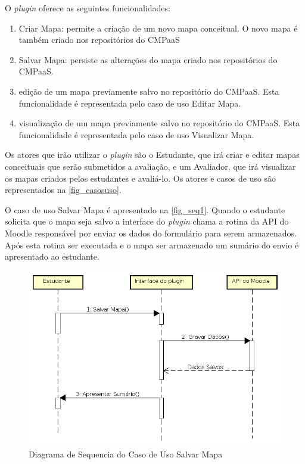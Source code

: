 \documentclass[
	12pt,				%
	openright,			%
	oneside,			%
	a4paper,			%
	english,			%
	french,				%
	spanish,			%
	brazil				%
	]{abntex2}
\begin{document}
O \textit{plugin} oferece as seguintes funcionalidades:

\begin{enumerate}
	\item Criar Mapa: permite a criação de um novo mapa conceitual. O novo mapa é também criado nos repositórios do CMPaaS
	\item Salvar Mapa: persiste as alterações do  mapa  criado  nos  repositórios  do  CMPaaS.
	\item  edição de um mapa previamente salvo no repositório do CMPaaS. Esta funcionalidade é representada pelo caso de uso Editar Mapa.
	\item visualização de um mapa previamente salvo no repositório do CMPaaS. Esta funcionalidade é representada pelo caso de uso Visualizar Mapa.
\end{enumerate}  

Os atores que irão utilizar o \textit{plugin} são o Estudante, que irá criar e editar mapas conceituais que serão submetidos a avaliação, e um Avaliador, que irá visualizar os mapas criados pelos estudantes e avaliá-lo. Os atores e casos de uso são representados na \autoref{fig_casosuso}.

O caso de uso Salvar Mapa é apresentado na \autoref{fig_seq1}. Quando o estudante solicita que o mapa seja salvo a interface do \textit{plugin} chama a rotina da API do Moodle responsável por enviar os dados do formulário para serem armazenados. Após esta rotina ser executada e o mapa ser armazenado um sumário do envio é apresentado ao estudante.

\begin{figure}[htb]
	\caption{\label{fig_seq1} Diagrama de Sequencia do Caso de Uso Salvar Mapa}
	\begin{center}
		\includegraphics[scale=0.5]{SeqDiagramPlugin.png}
	\end{center}
\end{figure} 
\end{document}
